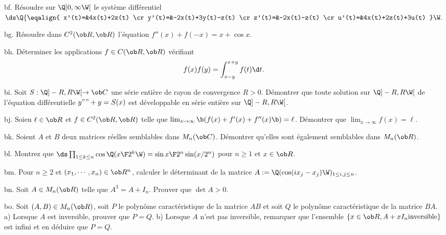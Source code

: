\exo [Level=2,Fight=1,Learn=0,Field=\SystèmesDifférentiels,Type=\Exercices,Origin=] bf. 
Résoudre sur $\Q]0,\infty\W[$ le système différentiel 
$\ds
\Q\{\eqalign{
x'(t)=&4x(t)+2z(t)
\cr
y'(t)=&-2x(t)+3y(t)-z(t)
\cr
z'(t)=&-2x(t)-z(t)
\cr
u'(t)=&4x(t)+2z(t)+3u(t)
}\W.
$

\exo [Level=2,Fight=2,Learn=1,Field=\SystèmesDifférentiels,Type=\Exercices,Origin=] bg. 
Résoudre dans $\sc C^2(\ob R,\ob R)$ l'équation $f''(x)+f(-x)=x+\cos x$. 

\exo [Level=2,Fight=0,Learn=0,Field=\EquationsDifférentiellesLinéairesDuSecondOrdre|\Intégration,Type=\Colles,Origin=] bh. 
Déterminer les applications $f\in\sc C(\ob R,\ob R)$ vérifiant 
$$
f(x)f(y)=\int_{x-y}^{x+y}f(t)\d t. 
$$

\exo [Level=2,Fight=2,Learn=1,Field=\SériesEntières,Type=\Exercices,Origin=] bi. 
Soit $S:\Q]-R,R\W[\to\ob C$ une série entière 
de rayon de convergence $R>0$. Démontrer que toute solution 
sur $\Q]-R,R\W[$ de l'équation différentielle $y""+y=S(x)$ 
est développable en série entière sur $\Q]-R,R\W[$. 

\exo [Level=2,Fight=0,Learn=0,Field=\EquationsDifférentielles,Type=\Others,Origin=] bj. 
Soien $\ell\in\ob R$ et $f\in\sc C^2(\ob R,\ob R)$ 
telle que $\lim_{x\to\infty}\b(f(x)+f'(x)+f''(x)\b)=\ell$. \pn
Démontrer que $\lim_{x\to\infty}f(x)=\ell$. 

\exo [Level=1,Fight=2,Learn=1,Field=\Matrices,Type=\Exercices,Origin=\MP] bk. 
Soient $A$ et $B$ deux matrices réelles semblables dans $\sc M_n(\ob C)$. 
Démontrer qu'elles sont également semblables dans $\sc M_n(\ob R)$. 

\exo [Level=1,Fight=3,Learn=2,Type=\Colles,Field=\Trigonométrie|\Récurrences,Origin=] bl. 
Montrez que $\ds\prod_{1\le k\le n}\cos\Q({x\F2^k}\W)={\sin x\F 2^n\sin(x/2^n)}$ pour $n\ge1$ et $x\in\ob R$. 

\exo[Level=2,Fight=2,Learn=1,Field=\Déterminant,Type=\Colles,Origin=\MP]  bm. 
Pour $n\ge2$ et $(x_1,\cdots, x_n)\in\ob R^n$, 
calculer le déterminant de la matrice $A:=\Q(\cos(ix_j-x_j)\W)_{1\le i,j\le n}$.  
 
\exo [Level=2,Fight=3,Learn=1,Field=\Diagonalisation,Type=\Others,Origin=\MP] bn. 
Soit $A\in\sc M_n(\ob R)$ telle que $A^3=A+I_n$. Prouver que $\det A>0$. 

\exo [Level=2,Fight=2,Learn=2,Field=\PolynômesCaractéristiques,Type=\Exercices,Origin=\MP] bo. 
Soit $(A,B)\in \sc M_n(\ob R)$, soit $P$ 
le polynôme caractéristique de la matrice $AB$ 
et soit $Q$ le polynôme caractéristique de la matrice $BA$. \pn
a) Lorsque $A$ est inversible, prouver que $P=Q$. \pn
b) Lorsque $A$ n'est pas inversible, 
remarquer que l'ensemble $\{x\in\ob R,A+xI_n\rm{ inversible}\}$ est infini 
et en déduire que $P=Q$. 

